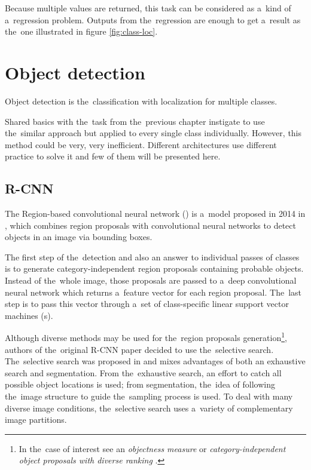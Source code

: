 Because multiple values are returned, this task can be considered as a~kind of
a~regression problem. Outputs from the~regression are enough to get a~result as 
the~one illustrated in figure \ref{fig:class-loc}. 

\section{Object detection}
\label{object-detection}

Object detection is the~classification with localization for multiple classes.

Shared basics with the~task from the~previous chapter instigate to use
the~similar approach but applied to every single class individually. However, this 
method could be very, very inefficient. Different architectures use different 
practice to solve it and few of them will be presented here.

\subsection{R-CNN}
\label{r-cnn}

The Region-based convolutional neural network () is a~model proposed 
in 2014 in \cite{rcnn}, which combines region proposals with convolutional 
neural networks to detect objects in an image via bounding boxes. 

The first step of the~detection and also an answer to individual passes of 
classes is to generate category-independent region proposals containing probable 
objects. Instead of the~whole image, those proposals are passed to a~deep 
convolutional neural network which returns a~feature vector for each region 
proposal. The~last step is to pass this vector through a~set of class-specific 
linear support vector machines (s).

Although diverse methods may be used for the~region proposals 
generation\footnote{In the~case of interest see an \textit{objectness measure} 
\cite{objectness} or \textit{category-independent object proposals with diverse 
ranking} \cite{cat-independent-proposals}.}, authors of the~original R-CNN paper 
decided to use the~selective search. The~selective search was proposed in 
\cite{selective-search} and mixes advantages of both an exhaustive search and 
segmentation. From the~exhaustive search, an effort to catch all possible object 
locations is used; from segmentation, the~idea of following the~image structure 
to guide the~sampling process is used. To deal with many diverse image 
conditions, the~selective search uses a~variety of complementary image 
partitions.

